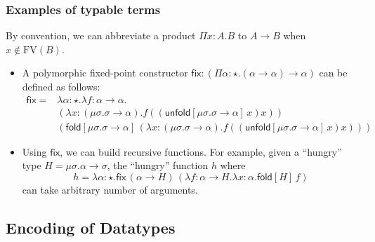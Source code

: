 \documentclass[oneside,a4paper]{article}
\theoremstyle{break}
\newcommand{\fold}[2]{\mathsf{fold}[#1]\,#2}
\newcommand{\unfold}[2]{\mathsf{unfold}[#1]\,#2}
\begin{document}
\subsubsection{Examples of typable terms}

By convention, we can abbreviate a product $\Pi x:A.B$ to $A \to B$
when $x \not \in \mathrm{FV}(B)$.

\begin{itemize}
  \newcommand{\FPTypeU}{\mu\sigma . \sigma \to \alpha}
  \newcommand{\FPTermfxx}{\lambda
    x:(\FPTypeU).f((\unfold{\FPTypeU}{x})x)}
  \newcommand{\FP}{\mathsf{fix}} %
\item A polymorphic fixed-point constructor
  $\FP:(\Pi \alpha:\star.(\alpha \to \alpha) \to \alpha)$ can be
  defined as follows:
\begin{align*}
  \FP=&\lambda \alpha:\star . \lambda f:\alpha \to \alpha.\\
      &(\FPTermfxx)\\
      &(\fold{\FPTypeU}{(\FPTermfxx)})
\end{align*}
\newcommand{\HGType}{\mu\sigma. \alpha \to \sigma}%
\item Using $\FP$, we can build recursive functions. For example,
  given a ``hungry'' type $H=\HGType$, the ``hungry'' function $h$
  where
  \[h=\lambda \alpha:\star.\FP\,(\alpha \to H)\,(\lambda f:\alpha \to
  H.\lambda x:\alpha.\fold{H}{f})\]
  can take arbitrary number of arguments.
\end{itemize}

\subsection{Encoding of Datatypes}
\end{document}

